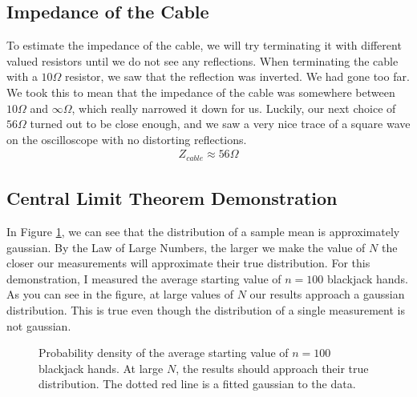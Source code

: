 \documentclass[12pt]{article}
\begin{document}
\subsection*{Impedance of the Cable}
To estimate the impedance of the cable, we will try terminating it with different valued resistors until we do not see any reflections. When terminating the cable with a $10\Omega$ resistor, we saw that the reflection was inverted. We had gone too far. We took this to mean that the impedance of the cable was somewhere between $10\Omega$ and $\infty\Omega$, which really narrowed it down for us. Luckily, our next choice of $56\Omega$ turned out to be close enough, and we saw a very nice trace of a square wave on the oscilloscope with no distorting reflections.
\begin{eqnarray}
Z_{cable} \approx 56\Omega \nonumber
\end{eqnarray}

\subsection*{Central Limit Theorem Demonstration}
In Figure \ref{fig:approachgaussian}, we can see that the distribution of a sample mean is approximately gaussian. By the Law of Large Numbers, the larger we make the value of $N$ the closer our measurements will approximate their true distribution. For this demonstration, I measured the average starting value of $n=100$ blackjack hands. As you can see in the figure, at large values of $N$ our results approach a gaussian distribution. This is true even though the distribution of a single measurement is not gaussian.

\begin{figure}[H]
\caption[SODUMB]{Probability density of the average starting value of $n=100$ blackjack hands. At large $N$, the results should approach their true distribution. The dotted red line is a fitted gaussian to the data.}
\label{fig:approachgaussian}
\end{figure}
\end{document}
